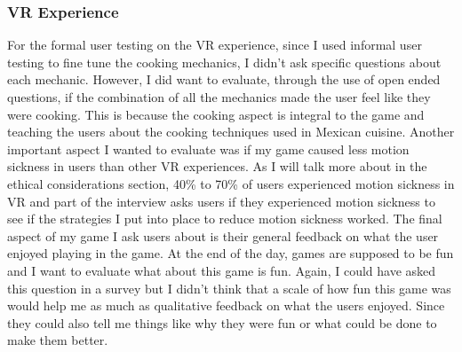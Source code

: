 \documentclass[10pt,twocolumn]{article}
\begin{document}
\subsubsection{VR Experience}
For the formal user testing on the VR experience, since I used informal user testing to fine tune the cooking mechanics, I didn't ask specific questions about each mechanic. However, I did want to evaluate, through the use of open ended questions, if the combination of all the mechanics made the user feel like they were cooking. This is because the cooking aspect is integral to the game and teaching the users about the cooking techniques used in Mexican cuisine. Another important aspect I wanted to evaluate was if my game caused less motion sickness in users than other VR experiences. As I will talk more about in the ethical considerations section, 40\% to 70\% of users experienced motion sickness in VR \cite{motionsicknessvr2019} and part of the interview asks users if they experienced motion sickness to see if the strategies I put into place to reduce motion sickness worked. The final aspect of my game I ask users about is their general feedback on what the user enjoyed playing in the game. At the end of the day, games are supposed to be fun and I want to evaluate what about this game is fun. Again, I could have asked this question in a survey but I didn’t think that a scale of how fun this game was would help me as much as qualitative feedback on what the users enjoyed. Since they could also tell me things like why they were fun or what could be done to make them better.
\end{document}
